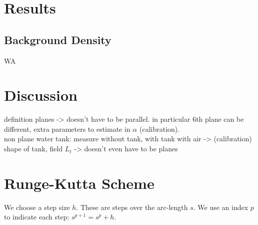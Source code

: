 \documentclass{article}
\begin{document}
\section{Results}

\subsection{Background Density}

WA
\section{Discussion}

definition planes -> doesn't have to be parallel. in particular 6th plane can be different, extra parameters to estimate in $\alpha$ (calibration). \\
non plane water tank: measure without tank, with tank with air -> (calibration) shape of tank, field $L_t$
-> doesn't even have to be planes

\printbibliography[heading=bibintoc]

\appendix

\section{Runge-Kutta Scheme}
\label{app:RKS}
We choose a step size $h$. These are steps over the arc-length $s$. We use an index $p$ to indicate each step: $s^{p+1} = s^{p} + h$.
\end{document}

